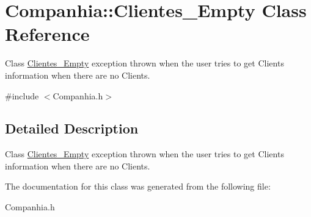 \hypertarget{class_companhia_1_1_clientes___empty}{}\section{Companhia\+:\+:Clientes\+\_\+\+Empty Class Reference}
\label{class_companhia_1_1_clientes___empty}


Class \hyperlink{class_companhia_1_1_clientes___empty}{Clientes\+\_\+\+Empty} exception thrown when the user tries to get Clients information when there are no Clients.  




{\ttfamily \#include $<$Companhia.\+h$>$}



\subsection{Detailed Description}
Class \hyperlink{class_companhia_1_1_clientes___empty}{Clientes\+\_\+\+Empty} exception thrown when the user tries to get Clients information when there are no Clients. 

The documentation for this class was generated from the following file\+:\begin{DoxyCompactItemize}
\item 
Companhia.\+h\end{DoxyCompactItemize}
